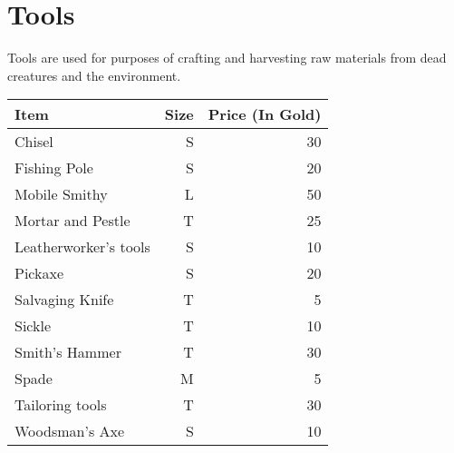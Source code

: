 \section{Tools}
Tools are used for purposes of crafting and harvesting raw materials from dead creatures and the environment.

\begin{longtable}{l | r | r}
	Item & Size & Price (In Gold)\\ \hline
	Chisel & S & 30\\
	Fishing Pole & S & 20\\
	Mobile Smithy & L & 50\\
	Mortar and Pestle & T & 25\\
	Leatherworker's tools & S & 10\\
	Pickaxe & S & 20\\
	Salvaging Knife & T & 5\\
	Sickle & T & 10\\
	Smith's Hammer & T & 30\\
	Spade & M & 5\\
	Tailoring tools & T & 30\\
	Woodsman's Axe & S & 10\\
\end{longtable}